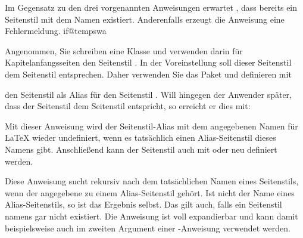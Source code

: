 Im Gegensatz zu den drei vorgenannten Anweisungen erwartet
, dass bereits ein Seitenstil mit dem Namen
 existiert. Anderenfalls erzeugt die Anweisung
eine Fehlermeldung.
%
\csname if@tempswa\endcsname%
\begin{Example}
  Angenommen, Sie schreiben eine Klasse und verwenden darin für
  Kapitelanfangsseiten den Seitenstil . In der
  Voreinstellung soll dieser Seitenstil dem Seitenstil 
  entsprechen. Daher verwenden Sie das Paket  und definieren
  mit
\begin{lstcode}
\end{lstcode}
  den Seitenstil  als Alias für den Seitenstil
  . Will hingegen der Anwender später, dass der Seitenstil
   dem Seitenstil  entspricht, so erreicht
  er dies mit:
\begin{lstcode}
\end{lstcode}%
\end{Example}%
\ExampleEndFix%
\fi
\EndIndexGroup


\begin{Declaration}
\end{Declaration}
%
%
Mit dieser Anweisung wird der Seitenstil-Alias mit dem angegebenen Namen
 für \LaTeX{} wieder undefiniert, wenn es
tatsächlich einen Alias-Seitenstil dieses Namens gibt. Anschließend kann der
Seitenstil auch mit  oder
 neu definiert werden.%
\iffalse %
\par
Die Anweisung ist dazu bestimmt, innerhalb des Arguments \PName{Code} von
\DescRef{\LabelBase.cmd.scrlayerOnAutoRemoveInterface} (siehe
\autoref{sec:scrlayer.enduserinterfaces},
\DescPageRef{scrlayer.cmd.scrlayerOnAutoRemoveInterface}) verwendet zu
werden, um Seitenstile, die als Teil eines Endanwender-Interfaces definiert
wurden, beim automatischen Entfernen dieses Interfaces mit zu entfernen.%
\fi%
\EndIndexGroup


\begin{Declaration}
\end{Declaration}
%
%
Diese Anweisung sucht rekursiv nach dem tatsächlichen Namen eines
Seitenstils, wenn der angegebene  zu einem
Alias-Seitenstil gehört. Ist  nicht der Name eines
Alias-Seitenstils, so ist das Ergebnis  selbst. Das
gilt auch, falls ein Seitenstil namens  gar nicht
existiert. Die Anweisung ist voll expandierbar und kann damit beispielsweise
auch im zweiten Argument einer -Anweisung verwendet werden.%
\EndIndexGroup



